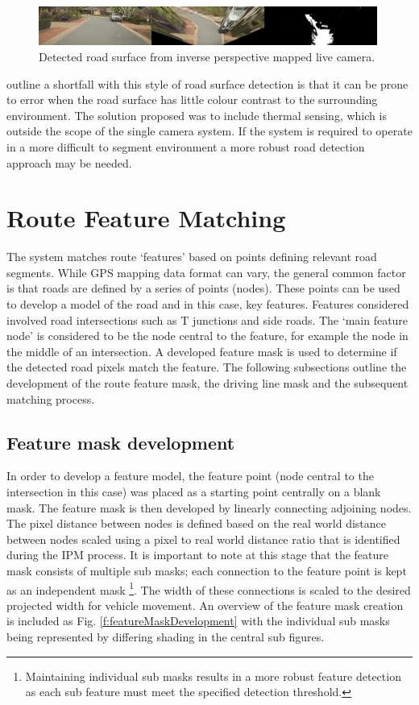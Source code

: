 \documentclass[]{aiaa-tc}%
\begin{document}
\begin{figure}
	\includegraphics[width=0.99\textwidth]{RoadDetection/histRoadLive.png}
	\caption{Detected road surface from inverse perspective mapped live camera.}
	\label{f:histRoadLive}
\end{figure}


\citet{histBackRefineShadows} outline a shortfall with this style of road surface detection is that it can be prone to error when the road surface has little colour contrast to the surrounding environment. The solution proposed was to include thermal sensing, which is outside the scope of the single camera system. If the system is required to operate in a more difficult to segment environment a more robust road detection approach may be needed. 


\section{Route Feature Matching}\label{sect:route_feature_matching}

The system matches route `features' based on points defining relevant road segments. While GPS mapping data format can vary, the general common factor is that roads are defined by a series of points (nodes). These points can be used to develop a model of the road and in this case, key features. Features considered involved road intersections such as T junctions and side roads. The `main feature node' is considered to be the node central to the feature, for example the node in the middle of an intersection. A developed feature mask is used to determine if the detected road pixels match the feature. The following subsections outline the development of the route feature mask, the driving line mask and the subsequent matching process.

\subsection{Feature mask development} \label{s:maskDevelopment}

In order to develop a feature model, the feature point (node central to the intersection in this case) was placed as a starting point centrally on a blank mask. The feature mask is then developed by linearly connecting adjoining nodes. The pixel distance between nodes is defined based on the real world distance between nodes scaled using a pixel to real world distance ratio that is identified during the IPM process. It is important to note at this stage that the feature mask consists of multiple sub masks; each connection to the feature point is kept as an independent mask \footnote{Maintaining individual sub masks results in a more robust feature detection as each sub feature must meet the specified detection threshold.}. The width of these connections is scaled to the desired projected width for vehicle movement. An overview of the feature mask creation is included as Fig. \ref{f:featureMaskDevelopment} with the individual sub masks being represented by differing shading in the central sub figures. 
\end{document}
